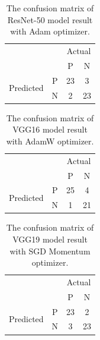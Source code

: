 \begin{table}[!h]
	\centering
	\caption{The confusion matrix of ResNet-50 model result with Adam optimizer.}
	\label{tab:conf_resnet50}
	\begin{tabular}{cc|c|c|}
		\cline{3-4}
		&   & \multicolumn{2}{c|}{Actual} \\ \cline{3-4} 
		&   & P            & N            \\ \hline
		\multicolumn{1}{|c|}{\multirow{2}{*}{Predicted}} & P & 23           & 3            \\ \cline{2-4} 
		\multicolumn{1}{|c|}{}                           & N & 2            & 23           \\ \hline
	\end{tabular}
\end{table}

\begin{table}[!h]
	\centering
	\caption{The confusion matrix of VGG16 model result with AdamW optimizer.}
	\label{tab:conf_vgg16}
	\begin{tabular}{cc|c|c|}
		\cline{3-4}
		&   & \multicolumn{2}{c|}{Actual} \\ \cline{3-4} 
		&   & P            & N            \\ \hline
		\multicolumn{1}{|c|}{\multirow{2}{*}{Predicted}} & P & 25           & 4            \\ \cline{2-4} 
		\multicolumn{1}{|c|}{}                           & N & 1            & 21           \\ \hline
	\end{tabular}
\end{table}

\begin{table}[!h]
	\centering
	\caption{The confusion matrix of VGG19 model result with SGD Momentum optimizer.}
	\label{tab:conf_vgg19}
	\begin{tabular}{cc|c|c|}
		\cline{3-4}
		&   & \multicolumn{2}{c|}{Actual} \\ \cline{3-4} 
		&   & P            & N            \\ \hline
		\multicolumn{1}{|c|}{\multirow{2}{*}{Predicted}} & P & 23           & 2            \\ \cline{2-4} 
		\multicolumn{1}{|c|}{}                           & N & 3            & 23           \\ \hline
	\end{tabular}
\end{table}

